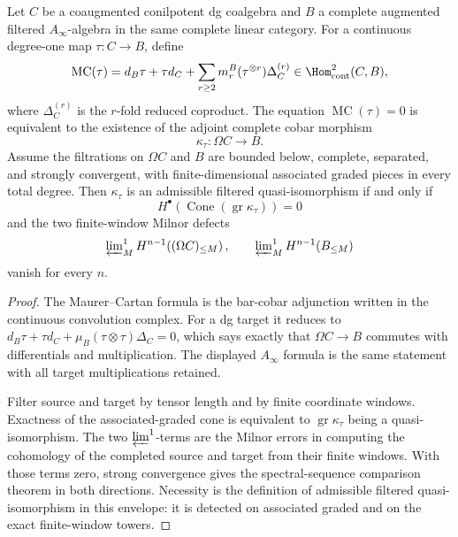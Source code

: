 \begin{lem}\label{lem:filtered-cobar-qiso-criterion}
  Let \(C\) be a coaugmented conilpotent dg coalgebra and \(B\) a
  complete augmented filtered \(A_\infty\)-algebra in the same complete
  linear category.  For a continuous degree-one map
  \(\tau\colon C\to B\), define
  \[
    \operatorname{MC}(\tau)
      =
      d_B\tau+\tau d_C
      +\sum_{r\geq2}m_r^B(\tau^{\otimes r})\Delta_C^{(r)}
      \in\Hom^2_{\mathrm{cont}}(C,B),
  \]
  where \(\Delta_C^{(r)}\) is the \(r\)-fold reduced coproduct.  The
  equation \(\operatorname{MC}(\tau)=0\) is equivalent to the existence
  of the adjoint complete cobar morphism
  \[
    \kappa_\tau\colon\Omega C\longrightarrow B .
  \]
  Assume the filtrations on \(\Omega C\) and \(B\) are bounded below,
  complete, separated, and strongly convergent, with finite-dimensional
  associated graded pieces in every total degree.  Then
  \(\kappa_\tau\) is an admissible filtered quasi-isomorphism if and
  only if
  \[
    H^\bullet\!\left(\operatorname{Cone}(
      \operatorname{gr}\kappa_\tau)\right)=0
  \]
  and the two finite-window Milnor defects
  \[
    \varprojlim\nolimits^1_M
      H^{n-1}\!\left((\Omega C)_{\leq M}\right),
    \qquad
    \varprojlim\nolimits^1_M
      H^{n-1}\!\left(B_{\leq M}\right)
  \]
  vanish for every \(n\).
\end{lem}

\begin{proof}
  The Maurer--Cartan formula is the bar-cobar adjunction written in the
  continuous convolution complex.  For a dg target it reduces to
  \(d_B\tau+\tau d_C+\mu_B(\tau\otimes\tau)\Delta_C=0\), which says
  exactly that \(\Omega C\to B\) commutes with differentials and
  multiplication.  The displayed \(A_\infty\) formula is the same
  statement with all target multiplications retained.

  Filter source and target by tensor length and by finite coordinate
  windows.  Exactness of the associated-graded cone is equivalent to
  \(\operatorname{gr}\kappa_\tau\) being a quasi-isomorphism.  The two
  \(\varprojlim^1\)-terms are the Milnor errors in computing the
  cohomology of the completed source and target from their finite
  windows.  With those terms zero, strong convergence gives the
  spectral-sequence comparison theorem in both directions.  Necessity is
  the definition of admissible filtered quasi-isomorphism in this
  envelope: it is detected on associated graded and on the exact
  finite-window towers.
\end{proof}

